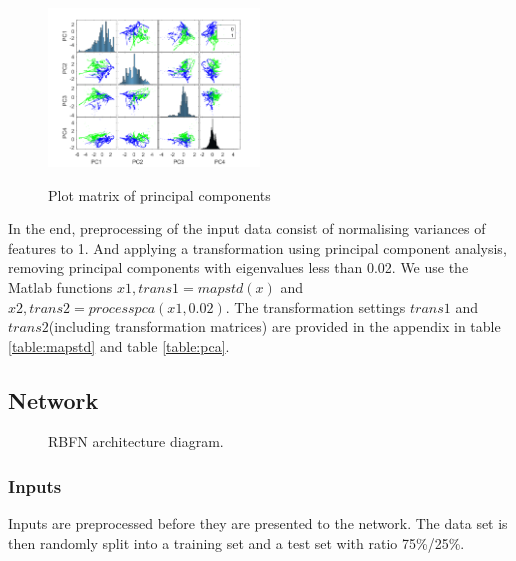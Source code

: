 \documentclass[a4paper, 11pt]{article}
\begin{document}
\begin{figure}[h]
  \caption{Plot matrix of principal components}
  \centering
    \includegraphics[width=0.5\textwidth]{../figures/pca_plotmatrix.png}
    \label{fig:pca_plotmatrix}
\end{figure}

In the end, preprocessing of the input data consist of normalising variances of features to 1. And applying a transformation using principal component analysis, removing principal components with eigenvalues less than 0.02. We use the Matlab functions $x1, trans1 = mapstd(x)$ and $x2, trans2 = processpca(x1, 0.02)$. The transformation settings $trans1$ and $trans2$(including transformation matrices) are provided in the appendix in table \ref{table:mapstd} and table \ref{table:pca}.
  


\subsection{Network}
\begin{figure}[h]
\centering
  \caption{RBFN architecture diagram.}
  \label{fig:architecture}
\end{figure}

\subsubsection{Inputs}
Inputs are preprocessed before they are presented to the network. The data set is then randomly split into a training set and a test set with ratio 75\%/25\%.
\end{document}
